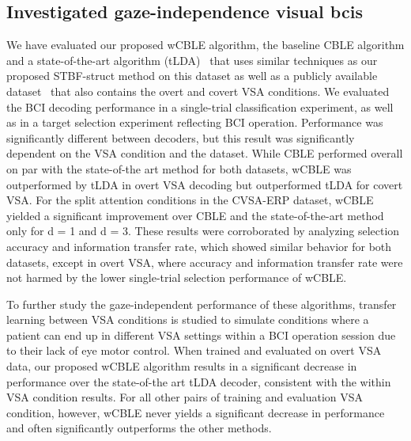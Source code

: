 


\subsection{Investigated gaze-independence visual \acsp{bci}}

We have evaluated our proposed wCBLE algorithm, the baseline CBLE algorithm and
a state-of-the-art algorithm (tLDA)~\cite{Sosulski2022} that uses similar techniques as our
proposed STBF-struct method on this dataset as well as a publicly available
dataset~\cite{Aloise2012} that also contains the overt and covert VSA conditions.
We evaluated the BCI decoding performance in a single-trial classification experiment,
as well as in a target selection experiment reflecting BCI operation.
Performance was significantly different between decoders, but this
result was significantly dependent on the VSA condition and the dataset.
While CBLE performed overall on par with the state-of-the art method for both datasets, wCBLE was
outperformed by tLDA in overt VSA decoding but outperformed
tLDA for covert VSA.
For the split attention conditions in the CVSA-ERP
dataset, wCBLE yielded a significant improvement over CBLE and the
state-of-the-art method only for d = 1 and d = 3.
These results were corroborated by analyzing selection accuracy and information
transfer rate, which showed similar behavior for both datasets, except in overt
VSA, where accuracy and information transfer rate were not harmed by the lower
single-trial selection performance of wCBLE.

To further study the gaze-independent performance of these algorithms, transfer
learning between VSA conditions is studied to simulate conditions where a patient
can end up in different VSA settings within a BCI operation session due to their
lack of eye motor control.
When trained and evaluated on overt VSA data, our proposed wCBLE algorithm results in a significant decrease in performance
over the state-of-the art tLDA decoder, consistent with the within VSA
condition results.
For all other pairs of training and evaluation VSA condition, however, wCBLE
never yields a significant decrease in performance and often significantly
outperforms the other methods.




